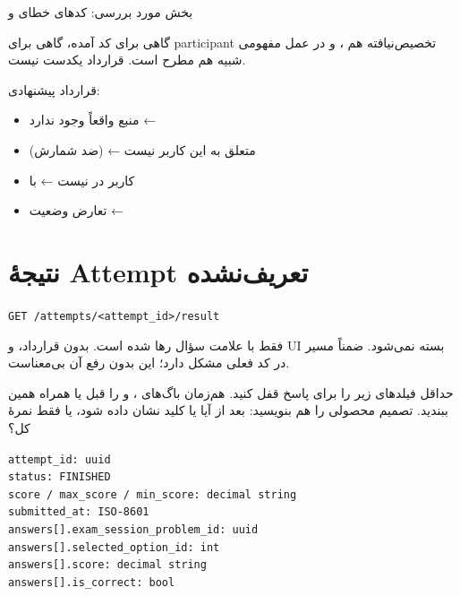\documentclass[a4paper,11pt]{article}
\newcommand{\apipath}[1]{\texttt{#1}}
\newcommand{\codeline}[1]{\apipath{#1}\\}
\begin{document}
\begin{apibox}
بخش مورد بررسی: کدهای خطای  و 
\end{apibox}

\begin{problembox}
گاهی برای  کد  آمده، گاهی برای participant تخصیص‌نیافته هم ،
و در عمل مفهومی شبیه  هم مطرح است. قرارداد یکدست نیست.
\end{problembox}

\begin{solutionbox}
قرارداد پیشنهادی:
\begin{itemize}
  \item منبع واقعاً وجود ندارد ← 
  \item {} متعلق به این کاربر نیست ←  (ضد شمارش)
  \item کاربر در  نیست ←  با
  \item تعارض وضعیت ← 
\end{itemize}
\end{solutionbox}

\section{نتیجهٔ Attempt تعریف‌نشده}

\begin{apibox}
\apipath{GET /attempts/<attempt\_id>/result}
\end{apibox}

\begin{problembox}
فقط با علامت سؤال رها شده است. بدون قرارداد،  و UI بسته نمی‌شود.
ضمناً مسیر  در کد فعلی مشکل دارد؛ این  بدون رفع آن بی‌معناست.
\end{problembox}

\begin{solutionbox}
حداقل فیلدهای زیر را برای پاسخ قفل کنید. هم‌زمان باگ‌های ،  و 
را قبل یا همراه همین  ببندید.
تصمیم محصولی را هم بنویسید: بعد از  آیا  یا کلید نشان داده شود، یا فقط نمرهٔ کل؟
\end{solutionbox}

\begin{codebox}
\codeline{attempt\_id: uuid}
\codeline{status: FINISHED}
\codeline{score / max\_score / min\_score: decimal string}
\codeline{submitted\_at: ISO-8601}
\codeline{answers[].exam\_session\_problem\_id: uuid}
\codeline{answers[].selected\_option\_id: int}
\codeline{answers[].score: decimal string}
\apipath{answers[].is\_correct: bool}
\end{codebox}
\end{document}
